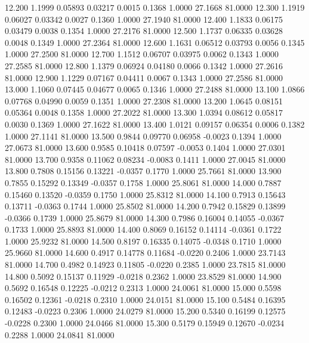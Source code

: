   12.200   1.1999   0.05893   0.03217   0.0015   0.1368   1.0000  27.1668  81.0000
  12.300   1.1919   0.06027   0.03342   0.0027   0.1360   1.0000  27.1940  81.0000
  12.400   1.1833   0.06175   0.03479   0.0038   0.1354   1.0000  27.2176  81.0000
  12.500   1.1737   0.06335   0.03628   0.0048   0.1349   1.0000  27.2364  81.0000
  12.600   1.1631   0.06512   0.03793   0.0056   0.1345   1.0000  27.2500  81.0000
  12.700   1.1512   0.06707   0.03975   0.0062   0.1343   1.0000  27.2585  81.0000
  12.800   1.1379   0.06924   0.04180   0.0066   0.1342   1.0000  27.2616  81.0000
  12.900   1.1229   0.07167   0.04411   0.0067   0.1343   1.0000  27.2586  81.0000
  13.000   1.1060   0.07445   0.04677   0.0065   0.1346   1.0000  27.2488  81.0000
  13.100   1.0866   0.07768   0.04990   0.0059   0.1351   1.0000  27.2308  81.0000
  13.200   1.0645   0.08151   0.05364   0.0048   0.1358   1.0000  27.2022  81.0000
  13.300   1.0394   0.08612   0.05817   0.0030   0.1369   1.0000  27.1622  81.0000
  13.400   1.0121   0.09157   0.06354   0.0006   0.1382   1.0000  27.1141  81.0000
  13.500   0.9844   0.09770   0.06958  -0.0023   0.1394   1.0000  27.0673  81.0000
  13.600   0.9585   0.10418   0.07597  -0.0053   0.1404   1.0000  27.0301  81.0000
  13.700   0.9358   0.11062   0.08234  -0.0083   0.1411   1.0000  27.0045  81.0000
  13.800   0.7808   0.15156   0.13221  -0.0357   0.1770   1.0000  25.7661  81.0000
  13.900   0.7855   0.15292   0.13349  -0.0357   0.1758   1.0000  25.8061  81.0000
  14.000   0.7887   0.15460   0.13520  -0.0359   0.1750   1.0000  25.8312  81.0000
  14.100   0.7913   0.15643   0.13711  -0.0363   0.1744   1.0000  25.8502  81.0000
  14.200   0.7942   0.15829   0.13899  -0.0366   0.1739   1.0000  25.8679  81.0000
  14.300   0.7986   0.16004   0.14055  -0.0367   0.1733   1.0000  25.8893  81.0000
  14.400   0.8069   0.16152   0.14114  -0.0361   0.1722   1.0000  25.9232  81.0000
  14.500   0.8197   0.16335   0.14075  -0.0348   0.1710   1.0000  25.9660  81.0000
  14.600   0.4917   0.14778   0.11684  -0.0220   0.2406   1.0000  23.7143  81.0000
  14.700   0.4982   0.14923   0.11805  -0.0220   0.2385   1.0000  23.7815  81.0000
  14.800   0.5092   0.15137   0.11929  -0.0218   0.2362   1.0000  23.8529  81.0000
  14.900   0.5692   0.16548   0.12225  -0.0212   0.2313   1.0000  24.0061  81.0000
  15.000   0.5598   0.16502   0.12361  -0.0218   0.2310   1.0000  24.0151  81.0000
  15.100   0.5484   0.16395   0.12483  -0.0223   0.2306   1.0000  24.0279  81.0000
  15.200   0.5340   0.16199   0.12575  -0.0228   0.2300   1.0000  24.0466  81.0000
  15.300   0.5179   0.15949   0.12670  -0.0234   0.2288   1.0000  24.0841  81.0000
